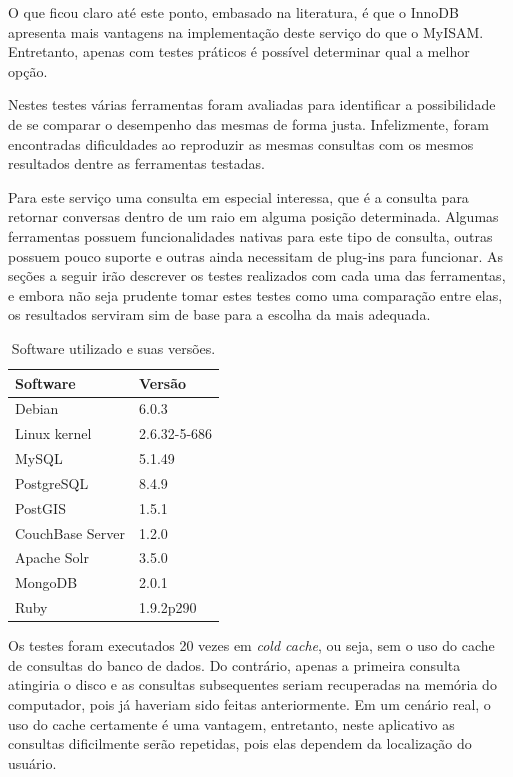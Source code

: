 \documentclass[diss]{template/setrem}
\begin{document}
O que ficou claro até este ponto, embasado na literatura, é que o InnoDB apresenta mais vantagens na implementação deste serviço do que o MyISAM. Entretanto, apenas com testes práticos é possível determinar qual a melhor opção.

Nestes testes várias ferramentas foram avaliadas para identificar a possibilidade de se comparar o desempenho das mesmas de forma justa. Infelizmente, foram encontradas dificuldades ao reproduzir as mesmas consultas com os mesmos resultados dentre as ferramentas testadas.

Para este serviço uma consulta em especial interessa, que é a consulta para retornar conversas dentro de um raio em alguma posição determinada. Algumas ferramentas possuem funcionalidades nativas para este tipo de consulta, outras possuem pouco suporte e outras ainda necessitam de plug-ins para funcionar. As seções a seguir irão descrever os testes realizados com cada uma das ferramentas, e embora não seja prudente tomar estes testes como uma comparação entre elas, os resultados serviram sim de base para a escolha da mais adequada.



\begin{table}
  \begin{center}
  	\footnotesize
  	\renewcommand{\arraystretch}{1.5}
    \begin{tabular}{ | l | l |}
    \hline
	\textbf{Software} & \textbf{Versão} \\ \hline
	Debian & 6.0.3 \\ \hline
	Linux kernel & 2.6.32-5-686 \\ \hline
	MySQL & 5.1.49 \\ \hline
	PostgreSQL & 8.4.9 \\ \hline
	PostGIS & 1.5.1 \\ \hline
	CouchBase Server & 1.2.0 \\ \hline
	Apache Solr & 3.5.0 \\ \hline
	MongoDB & 2.0.1 \\ \hline
	Ruby & 1.9.2p290 \\ \hline
    \end{tabular}
  \end{center}
  
  \caption{Software utilizado e suas versões.}
  \label{tab:test-softwares}
\end{table}



Os testes foram executados 20 vezes em \emph{cold cache}, ou seja, sem o uso do cache de consultas do banco de dados. Do contrário, apenas a primeira consulta atingiria o disco e as consultas subsequentes seriam recuperadas na memória do computador, pois já haveriam sido feitas anteriormente. Em um cenário real, o uso do cache certamente é uma vantagem, entretanto, neste aplicativo as consultas dificilmente serão repetidas, pois elas dependem da localização do usuário.
\end{document}
